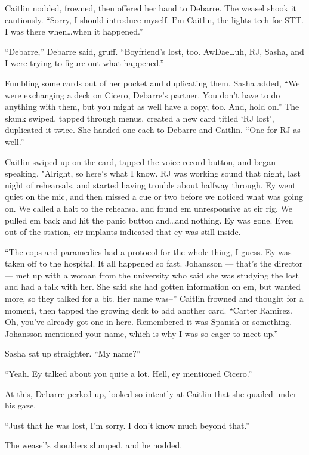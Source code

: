 Caitlin nodded, frowned, then offered her hand to Debarre. The weasel shook it cautiously. ``Sorry, I should introduce myself. I'm Caitlin, the lights tech for STT. I was there when\ldots{}when it happened.''

``Debarre,'' Debarre said, gruff. ``Boyfriend's lost, too. AwDae\ldots{}uh, RJ, Sasha, and I were trying to figure out what happened.''

Fumbling some cards out of her pocket and duplicating them, Sasha added, ``We were exchanging a deck on Cicero, Debarre's partner. You don't have to do anything with them, but you might as well have a copy, too. And, hold on.'' The skunk swiped, tapped through menus, created a new card titled `RJ lost', duplicated it twice. She handed one each to Debarre and Caitlin. ``One for RJ as well.''

Caitlin swiped up on the card, tapped the voice-record button, and began speaking. "Alright, so here's what I know. RJ was working sound that night, last night of rehearsals, and started having trouble about halfway through. Ey went quiet on the mic, and then missed a cue or two before we noticed what was going on. We called a halt to the rehearsal and found em unresponsive at eir rig. We pulled em back and hit the panic button and\ldots{}and nothing. Ey was gone. Even out of the station, eir implants indicated that ey was still inside.

``The cops and paramedics had a protocol for the whole thing, I guess. Ey was taken off to the hospital. It all happened so fast. Johansson — that's the director — met up with a woman from the university who said she was studying the lost and had a talk with her. She said she had gotten information on em, but wanted more, so they talked for a bit. Her name was--'' Caitlin frowned and thought for a moment, then tapped the growing deck to add another card. ``Carter Ramirez. Oh, you've already got one in here. Remembered it was Spanish or something. Johansson mentioned your name, which is why I was so eager to meet up.''

Sasha sat up straighter. ``My name?''

``Yeah. Ey talked about you quite a lot. Hell, ey mentioned Cicero.''

At this, Debarre perked up, looked so intently at Caitlin that she quailed under his gaze.

``Just that he was lost, I'm sorry. I don't know much beyond that.''

The weasel's shoulders slumped, and he nodded.

